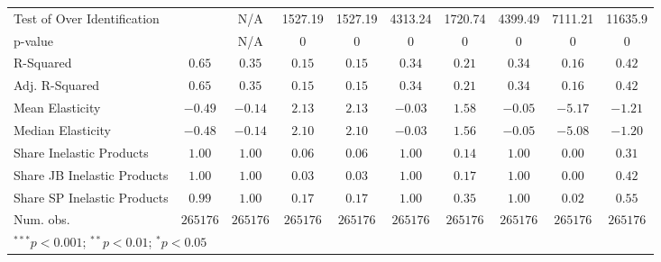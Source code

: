 \begin{tabular}{l c c c c c c c c c}
Test of Over Identification &               & N/A           & 1527.19       & 1527.19       & 4313.24       & 1720.74       & 4399.49       & 7111.21       & 11635.9       \\
p-value                     &               & N/A           & 0             & 0             & 0             & 0             & 0             & 0             & 0             \\
R-Squared                   & $0.65$        & $0.35$        & $0.15$        & $0.15$        & $0.34$        & $0.21$        & $0.34$        & $0.16$        & $0.42$        \\
Adj. R-Squared              & $0.65$        & $0.35$        & $0.15$        & $0.15$        & $0.34$        & $0.21$        & $0.34$        & $0.16$        & $0.42$        \\
Mean Elasticity             & $-0.49$       & $-0.14$       & $2.13$        & $2.13$        & $-0.03$       & $1.58$        & $-0.05$       & $-5.17$       & $-1.21$       \\
Median Elasticity           & $-0.48$       & $-0.14$       & $2.10$        & $2.10$        & $-0.03$       & $1.56$        & $-0.05$       & $-5.08$       & $-1.20$       \\
Share Inelastic Products    & $1.00$        & $1.00$        & $0.06$        & $0.06$        & $1.00$        & $0.14$        & $1.00$        & $0.00$        & $0.31$        \\
Share JB Inelastic Products & $1.00$        & $1.00$        & $0.03$        & $0.03$        & $1.00$        & $0.17$        & $1.00$        & $0.00$        & $0.42$        \\
Share SP Inelastic Products & $0.99$        & $1.00$        & $0.17$        & $0.17$        & $1.00$        & $0.35$        & $1.00$        & $0.02$        & $0.55$        \\
Num. obs.                   & $265176$      & $265176$      & $265176$      & $265176$      & $265176$      & $265176$      & $265176$      & $265176$      & $265176$      \\
\bottomrule
\multicolumn{10}{l}{\scriptsize{$^{***}p<0.001$; $^{**}p<0.01$; $^{*}p<0.05$}}
\end{tabular}
